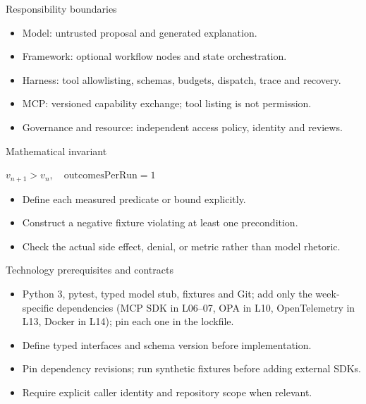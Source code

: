 \documentclass[aspectratio=169,10pt]{beamer}
\begin{document}
\begin{frame}{Responsibility boundaries}
\small
\begin{itemize}
\item Model: untrusted proposal and generated explanation.
\item Framework: optional workflow nodes and state orchestration.
\item Harness: tool allowlisting, schemas, budgets, dispatch, trace and recovery.
\item MCP: versioned capability exchange; tool listing is not permission.
\item Governance and resource: independent access policy, identity and reviews.
\end{itemize}

\end{frame}

\begin{frame}{Mathematical invariant}
\small
\begin{center}\Large $v_{n+1}>v_n,\quad\mathrm{outcomesPerRun}=1$\end{center}
\begin{itemize}
\item Define each measured predicate or bound explicitly.
\item Construct a negative fixture violating at least one precondition.
\item Check the actual side effect, denial, or metric rather than model rhetoric.
\end{itemize}

\end{frame}

\begin{frame}{Technology prerequisites and contracts}
\small
\begin{itemize}
\item Python 3, pytest, typed model stub, fixtures and Git; add only the week-specific dependencies (MCP SDK in L06--07, OPA in L10, OpenTelemetry in L13, Docker in L14); pin each one in the lockfile.
\item Define typed interfaces and schema version before implementation.
\item Pin dependency revisions; run synthetic fixtures before adding external SDKs.
\item Require explicit caller identity and repository scope when relevant.
\end{itemize}

\end{frame}
\end{document}
